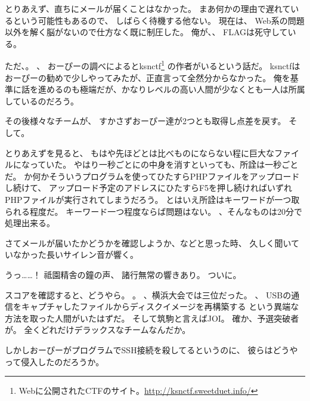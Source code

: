 とりあえず、直ちにメールが届くことはなかった。
まあ何かの理由で遅れているという可能性もあるので、
しばらく待機する他ない。
現在は、
Web系の問題以外を解く脳がないので仕方なく既に制圧した。
俺が、、
FLAGは死守している。

ただ、。
、
おーぴーの調べによるとksnctf\footnote{Webに公開されたCTFのサイト。\url{http://ksnctf.sweetduet.info/}}%
の作者がいるという話だ。
ksnctfはおーぴーの勧めで少しやってみたが、正直言って全然分からなかった。
俺を基準に話を進めるのも極端だが、かなりレベルの高い人間が少なくとも一人は所属しているのだろう。

その後様々なチームが、
すかさずおーぴー達が2つとも取得し点差を戻す。
そして。

とりあえずを見ると、
もはや先ほどとは比べものにならない程に巨大なファイルになっていた。
やはり一秒ごとにの中身を消すといっても、所詮は一秒ごとだ。
か何かそういうプログラムを使ってひたすらPHPファイルをアップロードし続けて、
アップロード予定のアドレスにひたすらF5を押し続ければいずれPHPファイルが実行されてしまうだろう。
とはいえ所詮はキーワードが一つ取られる程度だ。
キーワード一つ程度ならば問題はない。
、そんなものは20分で処理出来る。

さてメールが届いたかどうかを確認しようか、などと思った時、
久しく聞いていなかった長いサイレン音が響く。

うっ……！
祗園精舎の鐘の声、
諸行無常の響きあり。
ついに。

スコアを確認すると、どうやら。
。
、横浜大会では三位だった。
、
USBの通信をキャプチャしたファイルからディスクイメージを再構築する
という異端な方法を取った人間がいたはずだ。
そして筑駒と言えばJOI。
確か、予選突破者が。
全くどれだけデラックスなチームなんだか。

しかしおーぴーがプログラムでSSH接続を殺してるというのに、
彼らはどうやって侵入したのだろうか。


